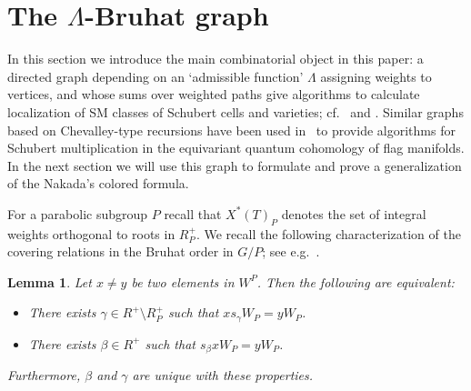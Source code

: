 \documentclass[11pt]{article}
\newtheorem{lemma}[theo]{Lemma}
\theoremstyle{definition}
\numberwithin{equation}{section}
\begin{document}
\section{The \texorpdfstring{$\Lambda$}{Lambda}-Bruhat graph}
\label{sec:LambdaBruhat}
In this section we introduce the main combinatorial object in this paper: a directed graph depending on an `admissible function' $\Lambda$ assigning weights to vertices, and whose sums over weighted paths give algorithms to calculate
localization of SM classes of Schubert cells and varieties; cf.~  and .
Similar graphs based on Chevalley-type recursions have been used in~\cite{mihalcea:eqqgr,mihalcea:eqqhom,naruse2014schubert,naruse2019skew} to provide algorithms for Schubert multiplication in the equivariant quantum cohomology of flag manifolds. In the next section we will use this graph to formulate and prove a generalization of the Nakada's colored formula. 

For a parabolic subgroup $P$ recall that $X^*(T)_P$ denotes the set of integral weights orthogonal 
to roots in $R_P^+$. We recall the following
characterization of the covering relations in the Bruhat order in $G/P$; see e.g.~\cite[Lemma 4.1]{fulton.woodward}.
\begin{lemma}\label{lem:P}
	Let $x \neq y$ be two elements in $W^P$. Then the following are equivalent:
	
	\begin{itemize} \item[(a)] There exists $\gamma \in R^{+} \setminus R_P^+$ such that $x s_\gamma  W_P=y W_P$.
		
		\item[(b)] There exists $\beta \in R^+$
		such that $s_\beta x W_P=y W_P$.
	\end{itemize} 
	Furthermore, $\beta$ and $\gamma $ are unique with these properties.
\end{lemma} 
\end{document}
